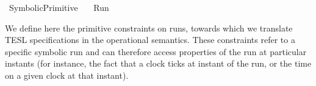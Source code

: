 %
\begin{isabellebody}%
%
%
\isadelimdocument
%
\endisadelimdocument
%
\isatagdocument
%
\isamarkuptrue%
%
\endisatagdocument
{\isafolddocument}%
%
\isadelimdocument
%
\endisadelimdocument
%
\isadelimtheory
%
\endisadelimtheory
%
\isatagtheory
{}\isamarkupfalse%
\ SymbolicPrimitive\isanewline
\ \ \ Run\isanewline
\isanewline
{}%
\endisatagtheory
{\isafoldtheory}%
%
\isadelimtheory
%
\endisadelimtheory
%
\begin{isamarkuptext}%
We define here the primitive constraints on runs, towards which we translate
  TESL specifications in the operational semantics.
  These constraints refer to a specific symbolic run and can therefore access
  properties of the run at particular instants (for instance, the fact that a clock
  ticks at instant  of the run, or the time on a given clock at 
  that instant).


\end{isamarkuptext}
\end{isabellebody}
